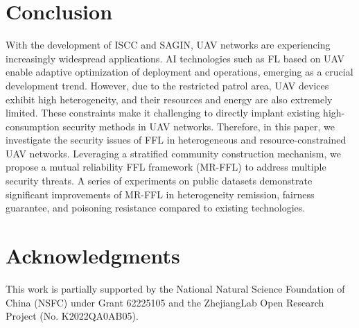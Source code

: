 \documentclass[lettersize,journal]{IEEEtran}
\begin{document}
\section{Conclusion}
With the development of ISCC and SAGIN, UAV networks are experiencing increasingly widespread applications. AI technologies such as FL based on UAV enable adaptive optimization of deployment and operations, emerging as a crucial development trend. However, due to the restricted patrol area, UAV devices exhibit high heterogeneity, and their resources and energy are also extremely limited. These constraints make it challenging to directly implant existing high-consumption security methods in UAV networks. Therefore, in this paper, we investigate the security issues of FFL in heterogeneous and resource-constrained UAV networks. Leveraging a stratified community construction mechanism, we propose a mutual reliability FFL framework (MR-FFL) to address multiple security threats. %
A series of experiments on public datasets demonstrate significant improvements of MR-FFL in heterogeneity remission, fairness guarantee, and poisoning resistance compared to existing technologies.



\section*{Acknowledgments}
This work is partially supported by the National Natural Science Foundation of China (NSFC) under Grant 62225105 and the ZhejiangLab Open Research Project (No. K2022QA0AB05).





\end{document}
